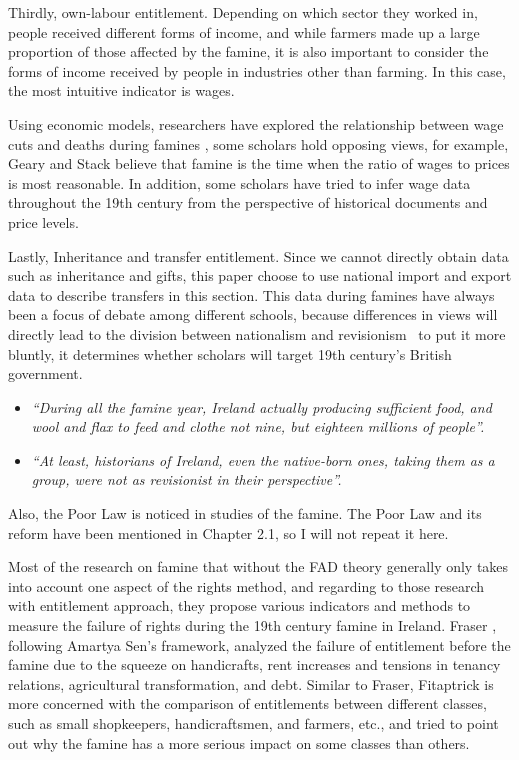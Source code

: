 Thirdly, own-labour entitlement. Depending on which sector they worked in, people received different forms of income, and while farmers made up a large proportion of those affected by the famine, it is also important to consider the forms of income received by people in industries other than farming. In this case, the most intuitive indicator is wages.

Using economic models, researchers have explored the relationship between wage cuts and deaths during famines
\citep{o1994economic}, some scholars hold opposing views, for example, Geary and Stack \citep{geary2004trends} believe that famine is the time when the ratio of wages to prices is most reasonable. In addition, some scholars \citep{guinnane1994great} have tried to infer wage data throughout the 19th century from the perspective of historical documents and price levels.

Lastly, Inheritance and transfer entitlement. Since we cannot directly obtain data such as inheritance and gifts, this paper choose to use national import and export data to describe transfers in this section. This data during famines have always been a focus of debate among different schools, because differences in views will directly lead to the division between nationalism and revisionism \textemdash\ to put it more bluntly, it determines whether scholars will target 19th century's British government. 

\begin{itemize}
    \item [] \textit{``During all the famine year, Ireland actually producing sufficient food, and wool and flax to feed and clothe not nine, but eighteen millions of people''.} \citep{mitchel1905apology}
    \item [] \textit{``At least, historians of Ireland, even the native-born ones, taking them as a group, were not as revisionist in their perspective''.}\citep{donnelly1996construction}
\end{itemize}

Also, the Poor Law is noticed in studies of the famine. The Poor Law and its reform have been mentioned in Chapter 2.1, so I will not repeat it here.

Most of the research on famine that without the FAD theory generally only takes into account one aspect of the rights method, and regarding to those research with entitlement approach, they propose various indicators and methods to measure the failure of rights during the 19th century famine in Ireland. Fraser \citep{fraser2003social}, following Amartya Sen's framework, analyzed the failure of entitlement before the famine due to the squeeze on handicrafts, rent increases and tensions in tenancy relations, agricultural transformation, and debt. Similar to Fraser, Fitaptrick \citep{fitzpatrick1995famine}  is more concerned with the comparison of entitlements between different classes, such as small shopkeepers, handicraftsmen, and farmers, etc., and tried to point out why the famine has a more serious impact on some classes than others.

